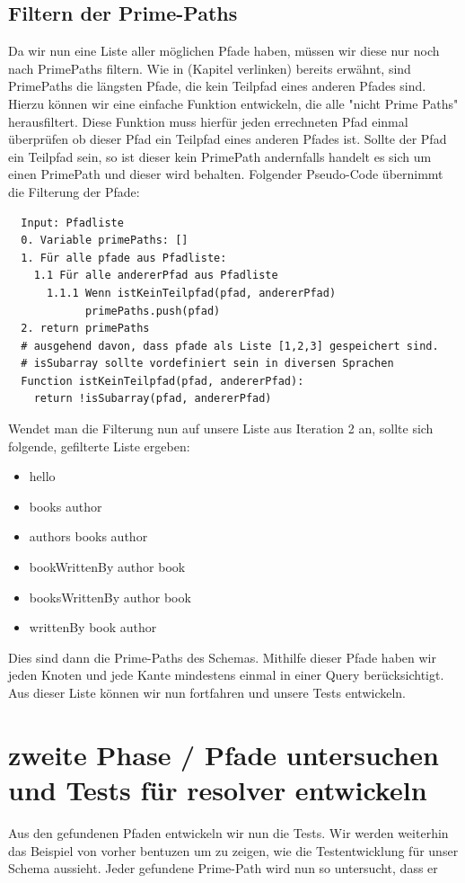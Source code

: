 \subsection{Filtern der Prime-Paths}

Da wir nun eine Liste aller möglichen Pfade haben, müssen wir diese nur noch nach PrimePaths filtern.
Wie in (Kapitel verlinken) bereits erwähnt, sind PrimePaths die längsten Pfade, die kein Teilpfad eines anderen Pfades sind.
Hierzu können wir eine einfache Funktion entwickeln, die alle "nicht Prime Paths" herausfiltert.
Diese Funktion muss hierfür jeden errechneten Pfad einmal überprüfen ob dieser Pfad ein Teilpfad eines anderen Pfades ist.
Sollte der Pfad ein Teilpfad sein, so ist dieser kein PrimePath andernfalls handelt es sich um einen PrimePath und
dieser wird behalten.
Folgender Pseudo-Code übernimmt die Filterung der Pfade:

\begin{verbatim}
  Input: Pfadliste
  0. Variable primePaths: []
  1. Für alle pfade aus Pfadliste:
    1.1 Für alle andererPfad aus Pfadliste
      1.1.1 Wenn istKeinTeilpfad(pfad, andererPfad)
            primePaths.push(pfad)
  2. return primePaths
  # ausgehend davon, dass pfade als Liste [1,2,3] gespeichert sind.
  # isSubarray sollte vordefiniert sein in diversen Sprachen
  Function istKeinTeilpfad(pfad, andererPfad):
    return !isSubarray(pfad, andererPfad)

\end{verbatim}

Wendet man die Filterung nun auf unsere Liste aus Iteration 2 an, sollte sich folgende, gefilterte Liste ergeben:

\begin{itemize}
  \item hello
  \item books \textrightarrow author
  \item authors \textrightarrow books \textrightarrow author
  \item bookWrittenBy \textrightarrow author \textrightarrow book
  \item booksWrittenBy \textrightarrow author \textrightarrow book
  \item writtenBy \textrightarrow book \textrightarrow author
\end{itemize}

Dies sind dann die Prime-Paths des Schemas.
Mithilfe dieser Pfade haben wir jeden Knoten und jede Kante mindestens einmal in einer Query berücksichtigt.
Aus dieser Liste können wir nun fortfahren und unsere Tests entwickeln.

\section{zweite Phase / Pfade untersuchen und Tests für resolver entwickeln}

Aus den gefundenen Pfaden entwickeln wir nun die Tests. Wir werden weiterhin das Beispiel von vorher bentuzen
um zu zeigen, wie die Testentwicklung für unser Schema aussieht.
Jeder gefundene Prime-Path wird nun so untersucht, dass er

